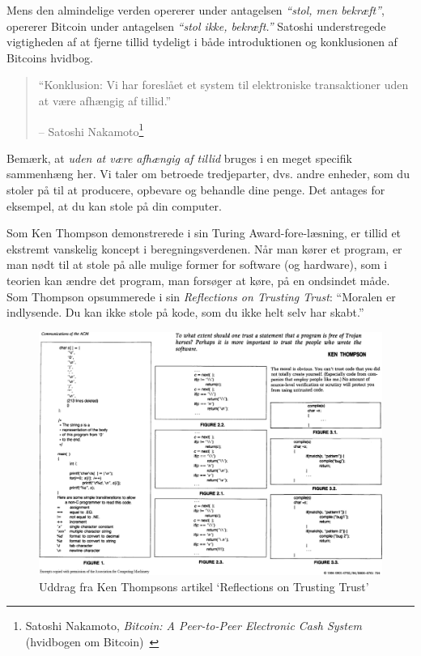 \documentclass[paper=6in:9in,pagesize=pdftex,headinclude=on,footinclude=on,12pt]{scrbook}
\begin{document}
Mens den almindelige verden opererer under antagelsen \textit{\enquote{stol, men bekræft}}, opererer Bitcoin under antagelsen \textit{\enquote{stol ikke, bekræft.}} Satoshi understregede vigtigheden af at fjerne tillid tydeligt i både introduktionen og konklusionen af Bitcoins hvidbog.\begin{quotation}\begin{samepage} \enquote{Konklusion: Vi har foreslået et system til elektroniske transaktioner uden at være afhængig af tillid.} \begin{flushright} -- Satoshi Nakamoto\footnote{Satoshi Nakamoto, \textit{Bitcoin: A Peer-to-Peer Electronic Cash System} (hvidbogen om Bitcoin)~\cite{whitepaper}}
\end{flushright}\end{samepage}\end{quotation}

Bemærk, at \textit{uden at være afhængig af tillid} bruges i en meget specifik sammenhæng her. Vi taler om betroede tredjeparter, dvs. andre enheder, som du stoler på til at producere, opbevare og behandle dine penge. Det antages for eksempel, at du kan stole på din computer.

Som Ken Thompson demonstrerede i sin Turing Award-fore-læsning, er tillid et ekstremt vanskelig koncept i beregningsverdenen. Når man kører et program, er man nødt til at stole på alle mulige former for software (og hardware), som i teorien kan ændre det program, man forsøger at køre, på en ondsindet måde. Som Thompson opsummerede i sin \textit{Reflections on Trusting Trust}: \enquote{Moralen er indlysende. Du kan ikke stole på kode, som du ikke helt selv har skabt.}~\cite{trusting-trust}

\begin{figure}
  \includegraphics{assets/images/ken-thompson-hack.png}
  \caption{Uddrag fra Ken Thompsons artikel `Reflections on Trusting Trust'}
  \label{fig:ken-thompson-hack}
\end{figure}
\end{document}

